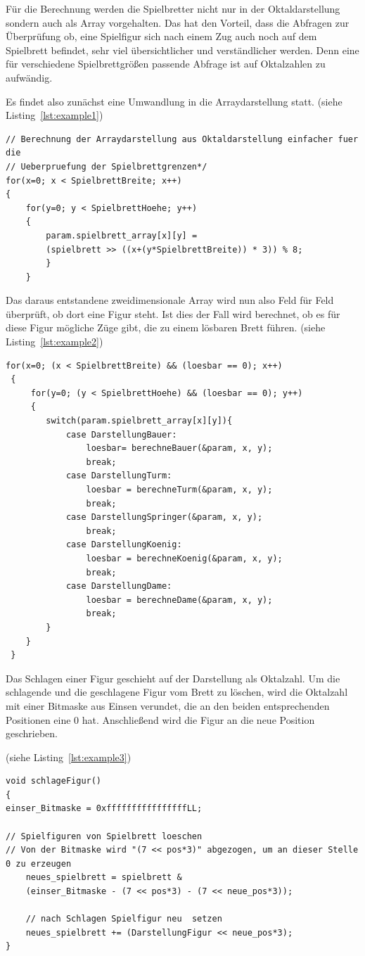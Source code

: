 \documentclass[
	12pt,
	a4paper,
	BCOR10mm,
	DIV14,
	listof=totoc,
	bibliography=totoc,
	headsepline
]{scrreprt}
\begin{document}
Für die Berechnung werden die Spielbretter nicht nur in der Oktaldarstellung sondern auch als Array vorgehalten. 
Das hat den Vorteil, dass die Abfragen zur Überprüfung ob, eine Spielfigur sich nach einem Zug auch noch auf dem Spielbrett befindet, sehr viel übersichtlicher und verständlicher werden. 
Denn eine für verschiedene Spielbrettgrößen passende Abfrage ist auf Oktalzahlen zu aufwändig.

Es findet also zunächst eine Umwandlung in die Arraydarstellung statt.
(siehe Listing~\ref{lst:example1})
\begin{lstlisting}[caption={Umwandlung in Arraydarstellung}, label={lst:example1}]  
// Berechnung der Arraydarstellung aus Oktaldarstellung einfacher fuer die 
// Ueberpruefung der Spielbrettgrenzen*/
for(x=0; x < SpielbrettBreite; x++)
{
    for(y=0; y < SpielbrettHoehe; y++)
    {   
		param.spielbrett_array[x][y] = 
		(spielbrett >> ((x+(y*SpielbrettBreite)) * 3)) % 8;
        }
    }
\end{lstlisting}

Das daraus entstandene zweidimensionale Array wird nun also Feld für Feld überprüft, ob dort eine Figur steht. Ist dies der Fall wird berechnet, ob es für diese Figur mögliche Züge gibt, die zu einem lösbaren Brett führen.
(siehe Listing~\ref{lst:example2})

\newpage

\begin{lstlisting}[caption={Berechnung eines Spielbrettes}, label={lst:example2}]
 for(x=0; (x < SpielbrettBreite) && (loesbar == 0); x++)
 {
     for(y=0; (y < SpielbrettHoehe) && (loesbar == 0); y++)
	 {   
		switch(param.spielbrett_array[x][y]){
			case DarstellungBauer:
				loesbar= berechneBauer(&param, x, y);
				break;
			case DarstellungTurm:
				loesbar = berechneTurm(&param, x, y);
				break;
			case DarstellungSpringer(&param, x, y);
				break;
			case DarstellungKoenig:
				loesbar = berechneKoenig(&param, x, y);
				break;
			case DarstellungDame:
				loesbar = berechneDame(&param, x, y);
				break;
		}
	}
 }
\end{lstlisting}


Das Schlagen einer Figur geschieht auf der Darstellung als Oktalzahl.
Um die schlagende und die geschlagene Figur vom Brett zu löschen, wird die Oktalzahl mit einer Bitmaske aus Einsen verundet, die an den beiden entsprechenden Positionen eine 0 hat.
Anschließend wird die Figur an die neue Position geschrieben. 


(siehe Listing~\ref{lst:example3})
\begin{lstlisting}[caption={Schlagen einer Figur}, label={lst:example3}]
void schlageFigur()
{
einser_Bitmaske = 0xffffffffffffffffLL;

// Spielfiguren von Spielbrett loeschen 
// Von der Bitmaske wird "(7 << pos*3)" abgezogen, um an dieser Stelle 0 zu erzeugen 
	neues_spielbrett = spielbrett & 
	(einser_Bitmaske - (7 << pos*3) - (7 << neue_pos*3));
	
	// nach Schlagen Spielfigur neu  setzen 
	neues_spielbrett += (DarstellungFigur << neue_pos*3);
}
\end{lstlisting}
\end{document}
